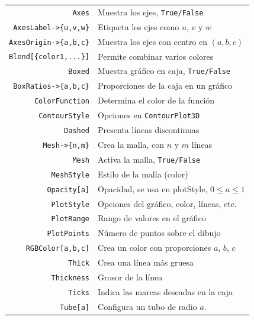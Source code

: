       \begin{tcolorbox}[title=Opciones de los gráficos]
        \begin{tabular}{rl}
          \verb"Axes" & Muestra los ejes, \verb"True/False"\\
          \verb"AxesLabel->{u,v,w}" & Etiqueta los ejes como $u$, $v$ y $w$ \\
          \verb"AxesOrigin->{a,b,c}" & Muestra los ejes con centro en $(a,b,c)$ \\
          \verb"Blend[{color1,...}]"& Permite combinar varios colores \\
          \verb"Boxed" & Muestra gráfico en caja, \verb"True/False"\\
          \verb"BoxRatios->{a,b,c}" & Proporciones de la caja en un gráfico\\
          \verb"ColorFunction" & Determina el color de la función\\
          \verb"ContourStyle" & Opciones en \verb"ContourPlot3D" \\
          \verb"Dashed" & Presenta líneas discontinuas\\
          \verb"Mesh->{n,m}" & Crea la malla, con $n$ y $m$ líneas \\
          \verb"Mesh" & Activa la malla, \verb"True/False" \\
          \verb"MeshStyle" & Estilo de la malla (color)\\
          \verb"Opacity[a]" &  Opacidad, se usa en plotStyle, $0 \leq a \leq 1$\\
          \verb"PlotStyle" &  Opciones del gráfico, color, líneas, etc.\\
          \verb"PlotRange" &  Rango de valores en el gráfico\\
          \verb"PlotPoints" & Número de puntos sobre el dibujo\\
          \verb"RGBColor[a,b,c]" & Crea un color con proporciones $a$, $b$, $c$\\
          \verb"Thick" & Crea una línea más gruesa \\
          \verb"Thickness" & Grosor de la línea \\
          \verb"Ticks" &  Indica las marcas deseadas en la caja\\
          \verb"Tube[a]" & Configura un tubo de radio $a$. \\
        \end{tabular}
      \end{tcolorbox}

